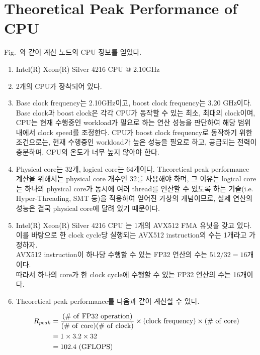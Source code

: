 \section{Theoretical Peak Performance of CPU}

Fig.~{}와 같이 계산 노드의 CPU 정보를 얻었다.

\begin{enumerate}[label= (\alph*)]

    \item {Intel(R) Xeon(R) Silver 4216 CPU @ 2.10GHz}
    \item {2개의 CPU가 장착되어 있다.}
    \item {
        Base clock frequency는 2.10GHz이고, boost clock frequency는 3.20 GHz이다.
        Base clock과 boost clock은 각각 CPU가 동작할 수 있는 최소, 최대의 clock이며,
        CPU는 현재 수행중인 workload가 필요로 하는 연산 성능을 판단하여 해당 범위 내에서 clock speed를 조정한다.
        CPU가 boost clock frequency로 동작하기 위한 조건으로는, 현재 수행중인 workload가 높은 성능을 필요로 하고,
        공급되는 전력이 충분하며, CPU의 온도가 너무 높지 않아야 한다.
    }
    \item {
        Physical core는 32개, logical core는 64개이다.
        Theoretical peak performance 계산을 위해서는 physical core 개수인 32를 사용해야 하며,
        그 이유는 logical core는 하나의 physical core가 동시에 여러 thread를 연산할 수 있도록 하는
        기술(i.e. Hyper-Threading, SMT 등)을 적용하여 얻어진 가상의 개념이므로,
        실제 연산의 성능은 결국 physical core에 달려 있기 때문이다.
    }
    \item {
        Intel(R) Xeon(R) Silver 4216 CPU 는 1개의 AVX512 FMA 유닛을 갖고 있다.
        이를 바탕으로 한 clock cycle당 실행되는 AVX512 instruction의 수는 1개라고 가정하자. \\
        AVX512 instruction이 하나당 수행할 수 있는 FP32 연산의 수는 $512/32=16$개이다. \\
        따라서 하나의 core가 한 clock cycle에 수행할 수 있는 FP32 연산의 수는 16개이다.
    }
    \item {
        Theoretical peak performance를 다음과 같이 계산할 수 있다.
        
        \begin{align}
            R_{peak}
            & =     \mathrm{\frac{(\#~of~FP32~operation)}{(\#~of~core)(\#~of~clock)}}
            \times  \mathrm{(clock~frequency)}
            \times  \mathrm{(\#~of~core)} \notag \\
            & = 1 \times 3.2 \times 32 \notag \\
            & = {102.4}~\mathrm{(GFLOPS)} \notag
        \end{align}
    
    }
    
\end{enumerate}